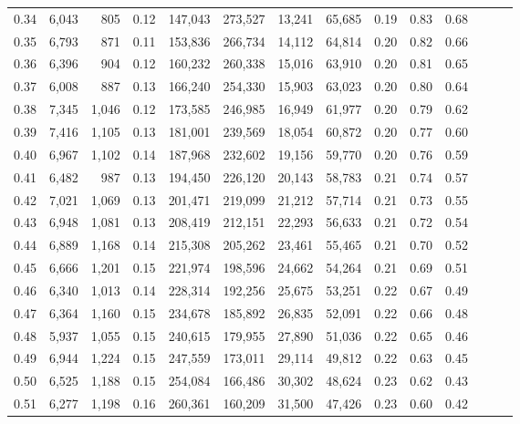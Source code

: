\begin{tabular}{rrrrrrrrrrrrrr}
0.34 &   6,043 &    805 &  0.12 &  147,043 &  273,527 &  13,241 &  65,685 &  0.19 &  0.83 &      0.68 \\
0.35 &   6,793 &    871 &  0.11 &  153,836 &  266,734 &  14,112 &  64,814 &  0.20 &  0.82 &      0.66 \\
0.36 &   6,396 &    904 &  0.12 &  160,232 &  260,338 &  15,016 &  63,910 &  0.20 &  0.81 &      0.65 \\
0.37 &   6,008 &    887 &  0.13 &  166,240 &  254,330 &  15,903 &  63,023 &  0.20 &  0.80 &      0.64 \\
0.38 &   7,345 &  1,046 &  0.12 &  173,585 &  246,985 &  16,949 &  61,977 &  0.20 &  0.79 &      0.62 \\
0.39 &   7,416 &  1,105 &  0.13 &  181,001 &  239,569 &  18,054 &  60,872 &  0.20 &  0.77 &      0.60 \\
0.40 &   6,967 &  1,102 &  0.14 &  187,968 &  232,602 &  19,156 &  59,770 &  0.20 &  0.76 &      0.59 \\
0.41 &   6,482 &    987 &  0.13 &  194,450 &  226,120 &  20,143 &  58,783 &  0.21 &  0.74 &      0.57 \\
0.42 &   7,021 &  1,069 &  0.13 &  201,471 &  219,099 &  21,212 &  57,714 &  0.21 &  0.73 &      0.55 \\
0.43 &   6,948 &  1,081 &  0.13 &  208,419 &  212,151 &  22,293 &  56,633 &  0.21 &  0.72 &      0.54 \\
0.44 &   6,889 &  1,168 &  0.14 &  215,308 &  205,262 &  23,461 &  55,465 &  0.21 &  0.70 &      0.52 \\
0.45 &   6,666 &  1,201 &  0.15 &  221,974 &  198,596 &  24,662 &  54,264 &  0.21 &  0.69 &      0.51 \\
0.46 &   6,340 &  1,013 &  0.14 &  228,314 &  192,256 &  25,675 &  53,251 &  0.22 &  0.67 &      0.49 \\
0.47 &   6,364 &  1,160 &  0.15 &  234,678 &  185,892 &  26,835 &  52,091 &  0.22 &  0.66 &      0.48 \\
0.48 &   5,937 &  1,055 &  0.15 &  240,615 &  179,955 &  27,890 &  51,036 &  0.22 &  0.65 &      0.46 \\
0.49 &   6,944 &  1,224 &  0.15 &  247,559 &  173,011 &  29,114 &  49,812 &  0.22 &  0.63 &      0.45 \\
0.50 &   6,525 &  1,188 &  0.15 &  254,084 &  166,486 &  30,302 &  48,624 &  0.23 &  0.62 &      0.43 \\
0.51 &   6,277 &  1,198 &  0.16 &  260,361 &  160,209 &  31,500 &  47,426 &  0.23 &  0.60 &      0.42 \\

\end{tabular}
